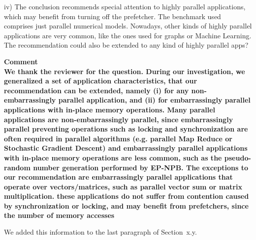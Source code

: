 \documentclass{article}
\newcounter{answer}
\newenvironment{answer}
{ \refstepcounter{answer}\vspace{0.5cm}\bfseries\noindent Comment~\theanswer\\ }
{ \vspace{0.5cm} }
\newcommand{\ms}[1]{\textcolor{orange}{\textbf{ msserpa: #1} }\vspace{0.2cm}}
\newcommand{\dcs}[1]{\textcolor{ForestGreen}{\textbf{dcsantos: #1} }\vspace{0.2cm}}
\begin{document}
iv) The conclusion recommends special attention to highly parallel applications, which may benefit from turning off the prefetcher. The benchmark used comprises just parallel numerical models. Nowadays, other kinds of highly parallel applications are very common, like the ones used for graphs or Machine Learning. The recommendation could also be extended to any kind of highly parallel apps?

\begin{answer}

We thank the reviewer for the question. During our investigation, we generalized a set of application characteristics, that our recommendation can be extended, namely (i) for any non-embarrassingly parallel application, and (ii) for embarrassingly parallel applications with in-place memory operations. Many parallel applications are non-embarrassingly parallel, since embarrassingly parallel preventing operations such as locking and synchronization are often required in parallel algorithms (e.g. parallel Map Reduce or Stochastic Gradient Descent) and embarrassingly parallel applications with in-place memory operations are less common, such as the pseudo-random number generation performed by EP-NPB. The exceptions to our recommendation are embarrassingly parallel applications that operate over vectors/matrices, such as parallel vector sum or matrix multiplication. these applications do not suffer from contention caused by synchronization or locking, and may benefit from prefetchers, since the number of memory accesses 


We added this information to the last paragraph of Section~x.y.
\end{answer}
\end{document}
